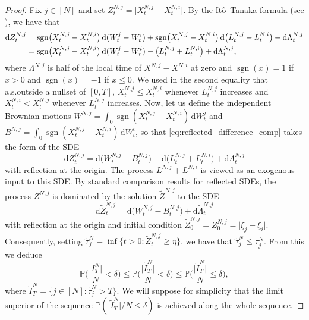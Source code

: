 \documentclass[11pt, a4paper]{article}
\theoremstyle{plain}
\theoremstyle{definition}
\theoremstyle{remark}
\numberwithin{equation}{section}
\DeclareMathOperator{\sgn}{sgn}
\newcommand{\pr}{\mathbb{P}}
\renewcommand{\d}{\mathrm{d}}
\newcommand{\define}{\mathpunct{:}}
\begin{document}
\begin{proof}
Fix $j \in [N]$ and set $Z^{N, j}_t = \lvert X^{N, j}_t - X^{N, i}_t\rvert$. By the It\^{o}--Tanaka formula (see \cite[Chapter 3, Theorem 7.1]{karatzas_bmsc_1998}), we have that
\begin{align} \label{eq:reflected_difference_comp}
    \d Z^{N, j}_t &= \sgn\bigl(X^{N, j}_t - X^{N, i}_t\bigr) \, \d (W^j_t - W^i_t) + \sgn\bigl(X^{N, j}_t - X^{N, i}_t\bigr) \, \d \bigl(L^{N, j}_t - L^{N, i}_t\bigr) + \d \Lambda^{N, j}_t \notag \\
    &= \sgn\bigl(X^{N, j}_t - X^{N, i}_t\bigr) \, \d (W^j_t - W^i_t) - \bigl(L^{N, j}_t + L^{N, i}_t\bigr) + \d \Lambda^{N, j}_t,
\end{align}
where $\Lambda^{N, j}$ is half of the local time of $X^{N, j} - X^{N, i}$ at zero and $\sgn(x) = 1$ if $x > 0$ and $\sgn(x) = -1$ if $x \leq 0$. We used in the second equality that a.s.\@ outside a nullset of $[0, T]$, $X^{N, j}_t \leq X^{N, i}_t$ whenever $L^{N, j}_t$ increases and $X^{N, i}_t < X^{N, j}_t$ whenever $L^{N, j}_t$ increases. Now, let us define the independent Brownian motions $W^{N, j} = \int_0^{\cdot} \sgn(X^{N, j}_t - X^{N, i}_t) \, \d W^j_t$ and $B^{N, j} = \int_0^{\cdot} \sgn(X^{N, j}_t - X^{N, i}_t) \, \d W^i_t$, so that \eqref{eq:reflected_difference_comp} takes the form of the SDE
\begin{equation}
    \d Z^{N, j}_t = \d \bigl(W^{N, j}_t - B^{N, j}_t\bigr) - \d \bigl(L^{N, j}_t + L^{N, i}_t\bigr) + \d \Lambda^{N, j}_t
\end{equation}
with reflection at the origin. The process $L^{N, j} + L^{N, i}$ is viewed as an exogenous input to this SDE. By standard comparison results for reflected SDEs, the process $Z^{N, j}$ is dominated by the solution $\tilde{Z}^{N, j}$ to the SDE
\begin{equation*}
    \d \tilde{Z}^{N, j}_t = \d \bigl(W^{N, j}_t - B^{N, j}_t\bigr) + \d \tilde{\Lambda}^{N, j}_t
\end{equation*}
with reflection at the origin and initial condition $\tilde{Z}^{N, j}_0 = Z^{N, j}_0 = \lvert\xi_j - \xi_i\rvert$. Consequently, setting $\tilde{\tau}^N_j = \inf\{t > 0 \define \tilde{Z}^{N, j}_t \geq \eta\}$, we have that $\tilde{\tau}^N_j \leq \tau^N_j$. From this we deduce
\begin{equation} \label{eq:non_tilde_to_tilde}
    \pr\biggl(\frac{\lvert I^N_T\rvert}{N} < \delta\biggr) \leq \pr\biggl(\frac{\lvert \tilde{I}^N_T\rvert}{N} < \delta\biggr) \leq \pr\biggl(\frac{\lvert \tilde{I}^N_T\rvert}{N} \leq \delta \biggr),
\end{equation}
where $\tilde{I}^N_T = \{j \in [N] \define \tilde{\tau}^N_j > T\}$. We will suppose for simplicity that the limit superior of the sequence $\pr(\lvert \tilde{I}^N_T\rvert/N \leq \delta)$ is achieved along the whole sequence. 


\end{proof}
\end{document}
